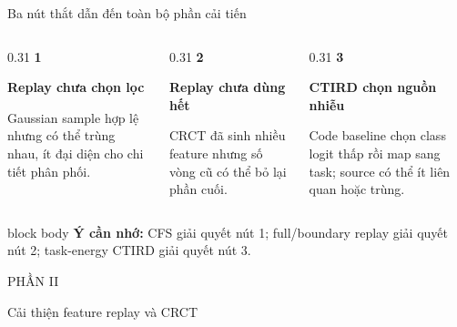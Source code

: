 \documentclass[aspectratio=169,11pt]{beamer}
\newcommand{\remember}[1]{%
  \vfill
  \begin{beamercolorbox}[wd=\textwidth,sep=0.22cm,rounded=true]{block body}
    \textbf{Ý cần nhớ:} #1
  \end{beamercolorbox}
}
\newcommand{\sectionframe}[2]{%
  \begin{frame}[plain]
    \vfill
    {\large\color{HRMBlue}#1}\par\vspace{0.35cm}
    {\Huge\color{HRMDark}#2}\par
    \vfill
  \end{frame}
}
\begin{document}
\begin{frame}{Ba nút thắt dẫn đến toàn bộ phần cải tiến}
  \begin{columns}[T,onlytextwidth]
    \begin{column}{0.31\textwidth}
      {\Large\bfseries\color{HRMBlue}1}\par
      \textbf{Replay chưa chọn lọc}\par\vspace{0.25cm}
      Gaussian sample hợp lệ nhưng có thể trùng nhau, ít đại diện cho chi tiết phân phối.
    \end{column}
    \begin{column}{0.31\textwidth}
      {\Large\bfseries\color{HRMBlue}2}\par
      \textbf{Replay chưa dùng hết}\par\vspace{0.25cm}
      CRCT đã sinh nhiều feature nhưng số vòng cũ có thể bỏ lại phần cuối.
    \end{column}
    \begin{column}{0.31\textwidth}
      {\Large\bfseries\color{HRMBlue}3}\par
      \textbf{CTIRD chọn nguồn nhiễu}\par\vspace{0.25cm}
      Code baseline chọn class logit thấp rồi map sang task; source có thể ít liên quan hoặc trùng.
    \end{column}
  \end{columns}
  \remember{CFS giải quyết nút 1; full/boundary replay giải quyết nút 2; task-energy CTIRD giải quyết nút 3.}
\end{frame}

\sectionframe{PHẦN II}{Cải thiện feature replay và CRCT}
\end{document}

